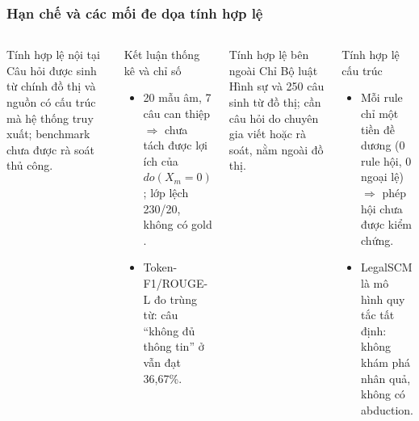 \begin{frame}
\frametitle{Hạn chế và các mối đe dọa tính hợp lệ}
\begin{columns}[T,onlytextwidth]
\begin{block}{Tính hợp lệ nội tại}
\footnotesize Câu hỏi được sinh từ chính đồ thị và nguồn có cấu trúc mà hệ thống truy xuất;
benchmark chưa được rà soát thủ công.
\end{block}
\vspace{0.05cm}
\begin{block}{Kết luận thống kê và chỉ số}
\footnotesize
\begin{itemize}
  \item 20 mẫu âm, 7 câu can thiệp $\Rightarrow$ chưa tách được lợi ích của $do(X_m=0)$;
        lớp lệch 230/20, không có gold \labUnc.
  \item Token-F1/ROUGE-L đo trùng từ: câu ``không đủ thông tin'' ở \exid{} vẫn đạt 36,67\%.
\end{itemize}
\end{block}
\begin{block}{Tính hợp lệ bên ngoài}
\footnotesize Chỉ Bộ luật Hình sự và 250 câu sinh từ đồ thị; cần câu hỏi do chuyên gia viết
hoặc rà soát, nằm ngoài đồ thị.
\end{block}
\vspace{0.05cm}
\begin{block}{Tính hợp lệ cấu trúc}
\footnotesize
\begin{itemize}
  \item Mỗi rule chỉ một tiền đề dương (0 rule hội, 0 ngoại lệ) $\Rightarrow$ phép hội chưa được kiểm chứng.
  \item LegalSCM là mô hình quy tắc tất định: không khám phá nhân quả, không có abduction.
\end{itemize}
\end{block}
\end{columns}

\vspace{0.12cm}
\end{frame}

